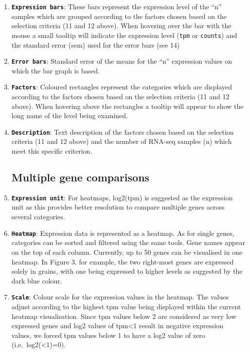 \begin{enumerate}
\item
  \textbf{\lstinline!Expression bars!}: These bars represent the
  expression level of the ``n'' samples which are grouped according to
  the factors chosen based on the selection criteria (11 and 12 above).
  When hovering over the bar with the mouse a small tooltip will
  indicate the expression level (\lstinline!tpm! or \lstinline!counts!)
  and the standard error (sem) used for the error bars (see 14)
\item
  \textbf{\lstinline!Error bars!}: Standard error of the means for the
  ``n'' expression values on which the bar graph is based.
\item
  \textbf{\lstinline!Factors!}: Coloured rectangles represent the
  categories which are displayed according to the factors chosen based
  on the selection criteria (11 and 12 above). When hovering above the
  rectangles a tooltip will appear to show the long name of the level
  being examined.
\item
  \textbf{\lstinline!Description!}: Text description of the factors
  chosen based on the selection criteria (11 and 12 above) and the
  number of RNA-seq samples (n) which meet this specific criterion.

  \subsection{\textbf{Multiple gene
  comparisons}}\label{multiple-gene-comparisons}
\item
  \textbf{\lstinline!Expression unit!}: For heatmaps, log2(tpm) is
  suggested as the expression unit as this provides better resolution to
  compare multiple genes across several categories.
\item
  \textbf{\lstinline!Heatmap!}: Expression data is represented as a
  heatmap. As for single genes, categories can be sorted and filtered
  using the same tools. Gene names appear on the top of each column.
  Currently, up to 50 genes can be visualised in one heatmap. In Figure
  3, for example, the two right-most genes are expressed solely in
  grains, with one being expressed to higher levels as suggested by the
  dark blue colour.
\item
  \textbf{\lstinline!Scale!}: Colour scale for the expression values in
  the heatmap. The values adjust according to the highest tpm value
  being displayed within the current heatmap visualisation. Since tpm
  values below 2 are considered as very low expressed genes and log2
  values of tpm\textless{}1 result in negative expression values, we
  forced tpm values below 1 to have a log2 value of zero
  (i.e.~log2(\textless{}1)=0).
\end{enumerate}

